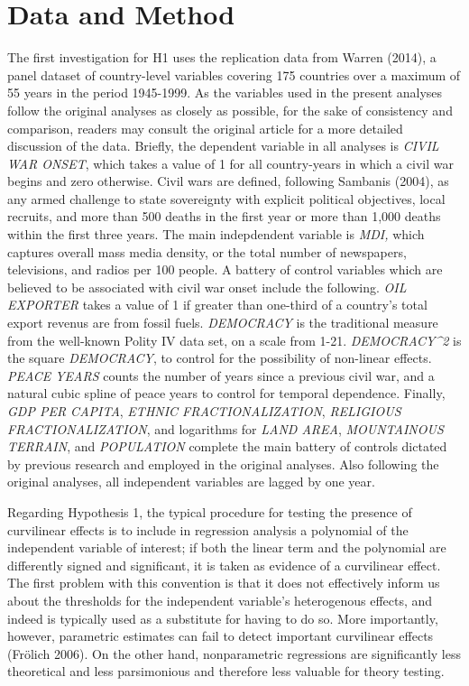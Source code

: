 \documentclass[11pt,article,oneside]{memoir}
\begin{document}
\section{Data and Method}\label{data-and-method}

The first investigation for H1 uses the replication data from Warren
(2014), a panel dataset of country-level variables covering 175
countries over a maximum of 55 years in the period 1945-1999. As the
variables used in the present analyses follow the original analyses as
closely as possible, for the sake of consistency and comparison, readers
may consult the original article for a more detailed discussion of the
data. Briefly, the dependent variable in all analyses is \emph{CIVIL WAR
ONSET}, which takes a value of 1 for all country-years in which a civil
war begins and zero otherwise. Civil wars are defined, following
Sambanis (2004), as any armed challenge to state sovereignty with
explicit political objectives, local recruits, and more than 500 deaths
in the first year or more than 1,000 deaths within the first three
years. The main indepdendent variable is \emph{MDI,} which captures
overall mass media density, or the total number of newspapers,
televisions, and radios per 100 people. A battery of control variables
which are believed to be associated with civil war onset include the
following. \emph{OIL EXPORTER} takes a value of 1 if greater than
one-third of a country's total export revenus are from fossil fuels.
\emph{DEMOCRACY} is the traditional measure from the well-known Polity
IV data set, on a scale from 1-21. \emph{DEMOCRACY\^{}2} is the square
\emph{DEMOCRACY}, to control for the possibility of non-linear effects.
\emph{PEACE YEARS} counts the number of years since a previous civil
war, and a natural cubic spline of peace years to control for temporal
dependence. Finally, \emph{GDP PER CAPITA}, \emph{ETHNIC
FRACTIONALIZATION}, \emph{RELIGIOUS FRACTIONALIZATION}, and logarithms
for \emph{LAND AREA}, \emph{MOUNTAINOUS TERRAIN}, and \emph{POPULATION}
complete the main battery of controls dictated by previous research and
employed in the original analyses. Also following the original analyses,
all independent variables are lagged by one year.

Regarding Hypothesis 1, the typical procedure for testing the presence
of curvilinear effects is to include in regression analysis a polynomial
of the independent variable of interest; if both the linear term and the
polynomial are differently signed and significant, it is taken as
evidence of a curvilinear effect. The first problem with this convention
is that it does not effectively inform us about the thresholds for the
independent variable's heterogenous effects, and indeed is typically
used as a substitute for having to do so. More importantly, however,
parametric estimates can fail to detect important curvilinear effects
(Fr{ö}lich 2006). On the other hand, nonparametric regressions are
significantly less theoretical and less parsimonious and therefore less
valuable for theory testing.
\end{document}

